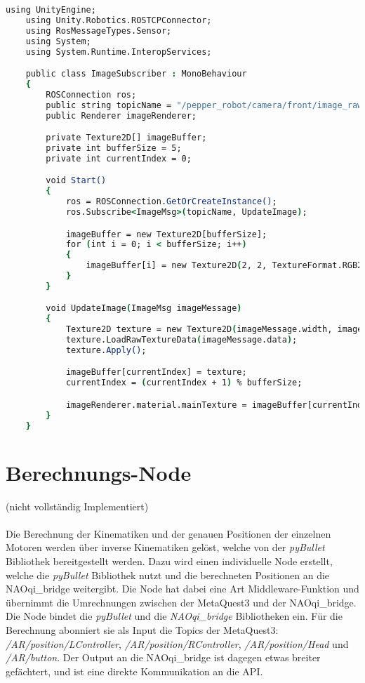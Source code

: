 \begin{lstlisting}[language=csh, caption=Abgreifen der Kamerabilder, label=lst:unity-image-data]
    using UnityEngine;
    using Unity.Robotics.ROSTCPConnector;
    using RosMessageTypes.Sensor;
    using System;
    using System.Runtime.InteropServices;

    public class ImageSubscriber : MonoBehaviour
    {
        ROSConnection ros;
        public string topicName = "/pepper_robot/camera/front/image_raw/compressed";
        public Renderer imageRenderer;

        private Texture2D[] imageBuffer;
        private int bufferSize = 5;
        private int currentIndex = 0;

        void Start()
        {
            ros = ROSConnection.GetOrCreateInstance();
            ros.Subscribe<ImageMsg>(topicName, UpdateImage);

            imageBuffer = new Texture2D[bufferSize];
            for (int i = 0; i < bufferSize; i++)
            {
                imageBuffer[i] = new Texture2D(2, 2, TextureFormat.RGB24, false);
            }
        }

        void UpdateImage(ImageMsg imageMessage)
        {
            Texture2D texture = new Texture2D(imageMessage.width, imageMessage.height, TextureFormat.RGB24, false);
            texture.LoadRawTextureData(imageMessage.data);
            texture.Apply();

            imageBuffer[currentIndex] = texture;
            currentIndex = (currentIndex + 1) % bufferSize;

            imageRenderer.material.mainTexture = imageBuffer[currentIndex];
        }
    }
\end{lstlisting}


\section{Berechnungs-Node}\label{sec:Berechnungs-Node}
(nicht vollständig Implementiert)\\\\
Die Berechnung der Kinematiken und der genauen Positionen der einzelnen Motoren werden über inverse Kinematiken gelöst, welche von der \textit{pyBullet} Bibliothek bereitgestellt werden. Dazu wird einen individuelle Node erstellt, welche die \textit{pyBullet} Bibliothek nutzt und die berechneten Positionen an die NAOqi\_bridge weitergibt. Die Node hat dabei eine Art Middleware-Funktion und übernimmt die Umrechnungen zwischen der MetaQuest3 und der NAOqi\_bridge.\\
Die Node bindet die \textit{pyBullet} und die \textit{NAOqi\_bridge} Bibliotheken ein. Für die Berechnung abonniert sie als Input die Topics der MetaQuest3: \textit{/AR/position/LController}, \textit{/AR/position/RController}, \textit{/AR/position/Head} und \textit{/AR/button}. Der Output an die NAOqi\_bridge ist dagegen etwas breiter gefächtert, und ist eine direkte Kommunikation an die \ac{API}.\\

